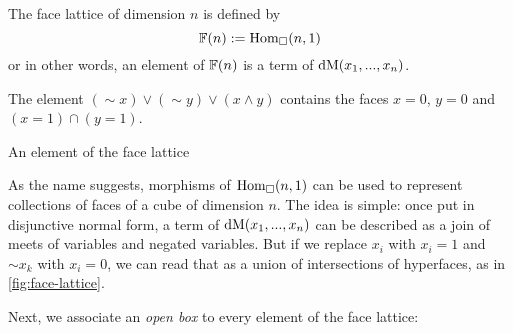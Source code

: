\begin{definition}
    The face lattice of dimension \( n \) is defined by
    \[
        \faces(n) := \hom[\catCube]{n}{1}
    \]
    or in other words, an element of \( \faces(n) \) is a term of
    \( \demorgan{x_1 , ... , x_n} \).
\end{definition}
% 
\begin{marginfigure}


\begin{small}
The element \( ({\sim} x) \lor ({\sim} y) \lor (x \land y) \) contains the
faces \( x = 0 \), \( y = 0 \) and \( (x = 1) \cap (y = 1) \).
\end{small}
\caption{An element of the face lattice}
    \label{fig:face-lattice}
\end{marginfigure}
% 
As the name suggests, morphisms of \( \hom[\catCube]{n}{1} \) can be used to
represent collections of faces of a cube of dimension \( n \). 
% 
The idea is simple: once put in disjunctive normal form, a term of 
\( \demorgan{x_1 , ... , x_n} \) can be described as a join of meets
of variables and negated variables.
% 
But if we replace \( x_i \) with \( x_i = 1 \) and \( {\sim} x_k \) with
\( x_i = 0 \), we can read that as a union of intersections of hyperfaces,
as in \cref{fig:face-lattice}.

Next, we associate an \emph{open box} to every element of the face lattice:

